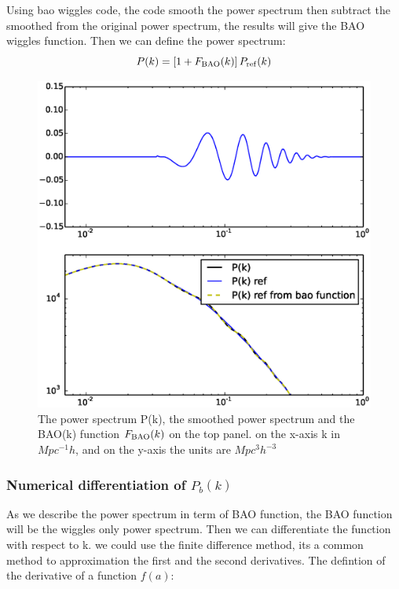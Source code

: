 \documentclass[10pt,a4paper]{article}
\begin{document}
Using bao wiggles code,  the code smooth the power spectrum then subtract the smoothed from the original power spectrum, the results will give the BAO wiggles function. 
Then we can define the power spectrum:
\begin{equation}
P(k) = \left[1 + F_{\rm BAO}(k)\right] P_{\rm ref}(k)
\end{equation}


\begin{figure}
\includegraphics[width=1.0\textwidth]{test_wiggles_func.eps}
\caption{The power spectrum P(k), the smoothed power spectrum and the BAO(k)  function $F_{\rm BAO}(k)$ on the top panel. on the x-axis  k in $Mpc^{-1} h	 $, and on the y-axis the units are $Mpc^{3} h^{-3}$}
\label{fig:test_wiggles_func}
\end{figure}

\subsubsection{Numerical differentiation of $P_b(k)$}

As we describe the power spectrum in term of BAO function, the BAO function will be the wiggles only power spectrum. Then we can differentiate the function with respect to k.
we could use the finite difference method, its a common method to  approximation  the first and the second derivatives. The  defintion of the derivative of a function $f(a)$:
\end{document}
